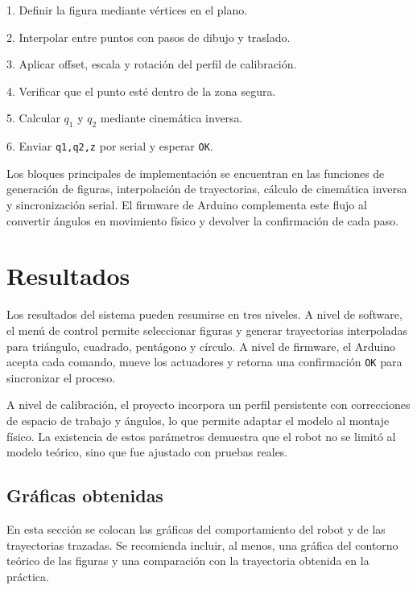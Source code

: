 \documentclass[11pt,letterpaper,onecolumn]{article}
\begin{document}
\begin{tcolorbox}[
  colback=bgLight,
  colframe=accentGray,
  boxrule=0.8pt,
  arc=2pt,
  left=6pt,
  right=6pt,
  top=4pt,
  bottom=4pt,
  fontupper=\ttfamily\small,
  breakable,
]
1. Definir la figura mediante vértices en el plano.

2. Interpolar entre puntos con pasos de dibujo y traslado.

3. Aplicar offset, escala y rotación del perfil de calibración.

4. Verificar que el punto esté dentro de la zona segura.

5. Calcular $q_1$ y $q_2$ mediante cinemática inversa.

6. Enviar \texttt{q1,q2,z} por serial y esperar \texttt{OK}.
\end{tcolorbox}

Los bloques principales de implementación se encuentran en las funciones de generación de figuras, interpolación de trayectorias, cálculo de cinemática inversa y sincronización serial. El firmware de Arduino complementa este flujo al convertir ángulos en movimiento físico y devolver la confirmación de cada paso.



\section{Resultados}
\justify

Los resultados del sistema pueden resumirse en tres niveles. A nivel de software, el menú de control permite seleccionar figuras y generar trayectorias interpoladas para triángulo, cuadrado, pentágono y círculo. A nivel de firmware, el Arduino acepta cada comando, mueve los actuadores y retorna una confirmación \texttt{OK} para sincronizar el proceso.

A nivel de calibración, el proyecto incorpora un perfil persistente con correcciones de espacio de trabajo y ángulos, lo que permite adaptar el modelo al montaje físico. La existencia de estos parámetros demuestra que el robot no se limitó al modelo teórico, sino que fue ajustado con pruebas reales.

\subsection{Gráficas obtenidas}

En esta sección se colocan las gráficas del comportamiento del robot y de las trayectorias trazadas. Se recomienda incluir, al menos, una gráfica del contorno teórico de las figuras y una comparación con la trayectoria obtenida en la práctica.
\end{document}
